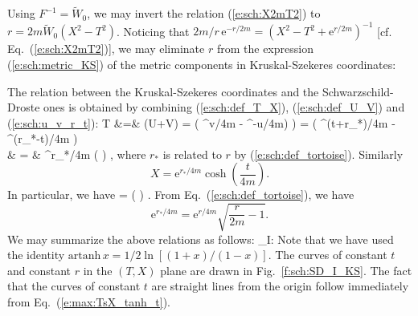 Using $F^{-1} = \tilde{W}_0$, we may invert the relation (\ref{e:sch:X2mT2})
to $r = 2m \tilde{W}_0(X^2-T^2)$. Noticing that
$2m/r \, \mathrm{e}^{-r/2m} = (X^2-T^2 + \mathrm{e}^{r/2m})^{-1}$
[cf. Eq.~(\ref{e:sch:X2mT2})], we may eliminate $r$ from the expression
(\ref{e:sch:metric_KS})
of the metric components in Kruskal-Szekeres coordinates:
\be \label{e:sch:metric_KS_TX_partial}
\ee


The relation between the Kruskal-Szekeres coordinates and the
Schwarzschild-Droste ones is obtained by combining (\ref{e:sch:def_T_X}),
(\ref{e:sch:def_U_V}) and (\ref{e:sch:u_v_r_t}):
\bea
    T &=& (U+V) =  \left( ^{v/4m}
        - ^{-u/4m)} \right) =
         \left( ^{(t+r_*)/4m}
        - ^{(r_*-t)/4m} \right) \nonumber \\
     & = & ^{r_*/4m} \sinh\left(  \right) ,\nonumber
\eea
where $r_*$ is related to $r$ by (\ref{e:sch:def_tortoise}).
Similarly
\[
     X = \mathrm{e}^{r_*/4m} \cosh\left( \frac{t}{4m} \right) .
\]
In particular, we have
\be \label{e:max:TsX_tanh_t}
     = \tanh\left(  \right) .
\ee
From Eq.~(\ref{e:sch:def_tortoise}), we have
\[
    \mathrm{e}^{r_*/4m} = \mathrm{e}^{r/4m} \sqrt{ \frac{r}{2m} - 1 } .
\]
We may summarize the above relations as follows:
\be \label{e:sch:KS_SD_I}
    \M_{\rm I}: \quad {}
    \iff
\ee
Note that we have used the identity $\mathrm{artanh}\, x = 1/2 \ln\left[(1+x)/(1-x)\right]$.
The curves of constant $t$ and constant $r$ in the $(T,X)$ plane
are drawn in Fig.~\ref{f:sch:SD_I_KS}.
The fact that the curves of constant $t$ are straight lines from the
origin follow immediately
from Eq.~(\ref{e:max:TsX_tanh_t}).

